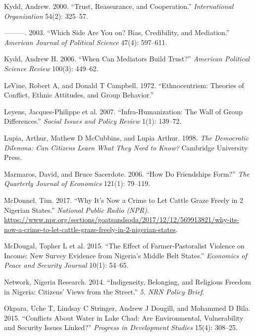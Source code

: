 \documentclass[11pt]{article}
\begin{document}
\hypertarget{ref-kydd2000trust}{}
Kydd, Andrew. 2000. ``Trust, Reassurance, and Cooperation.''
\emph{International Organization} 54(2): 325--57.

\hypertarget{ref-kydd2003side}{}
---------. 2003. ``Which Side Are You on? Bias, Credibility, and
Mediation.'' \emph{American Journal of Political Science} 47(4):
597--611.

\hypertarget{ref-kydd2006can}{}
Kydd, Andrew H. 2006. ``When Can Mediators Build Trust?'' \emph{American
Political Science Review} 100(3): 449--62.

\hypertarget{ref-levine1972ethnocentrism}{}
LeVine, Robert A, and Donald T Campbell. 1972. ``Ethnocentrism: Theories
of Conflict, Ethnic Attitudes, and Group Behavior.''

\hypertarget{ref-leyens2007infra}{}
Leyens, Jacques-Philippe et al. 2007. ``Infra-Humanization: The Wall of
Group Differences.'' \emph{Social Issues and Policy Review} 1(1):
139--72.

\hypertarget{ref-lupia1998democratic}{}
Lupia, Arthur, Mathew D McCubbins, and Lupia Arthur. 1998. \emph{The
Democratic Dilemma: Can Citizens Learn What They Need to Know?}
Cambridge University Press.

\hypertarget{ref-marmaros2006friendships}{}
Marmaros, David, and Bruce Sacerdote. 2006. ``How Do Friendships Form?''
\emph{The Quarterly Journal of Economics} 121(1): 79--119.

\hypertarget{ref-mcdonnel2017graze}{}
McDonnel, Tim. 2017. ``Why It's Now a Crime to Let Cattle Graze Freely
in 2 Nigerian States.'' \emph{National Public Radio (NPR)}.
\url{https://www.npr.org/sections/goatsandsoda/2017/12/12/569913821/why-its-now-a-crime-to-let-cattle-graze-freely-in-2-nigerian-states}.

\hypertarget{ref-mcdougal2015effect}{}
McDougal, Topher L et al. 2015. ``The Effect of Farmer-Pastoralist
Violence on Income: New Survey Evidence from Nigeria's Middle Belt
States.'' \emph{Economics of Peace and Security Journal} 10(1): 54--65.

\hypertarget{ref-nigeria2014freedom}{}
Network, Nigeria Research. 2014. ``Indigeneity, Belonging, and Religious
Freedom in Nigeria: Citizens' Views from the Street.'' \emph{5. NRN
Policy Brief}.

\hypertarget{ref-okpara2015conflicts}{}
Okpara, Uche T, Lindsay C Stringer, Andrew J Dougill, and Mohammed D
Bila. 2015. ``Conflicts About Water in Lake Chad: Are Environmental,
Vulnerability and Security Issues Linked?'' \emph{Progress in
Development Studies} 15(4): 308--25.
\end{document}
